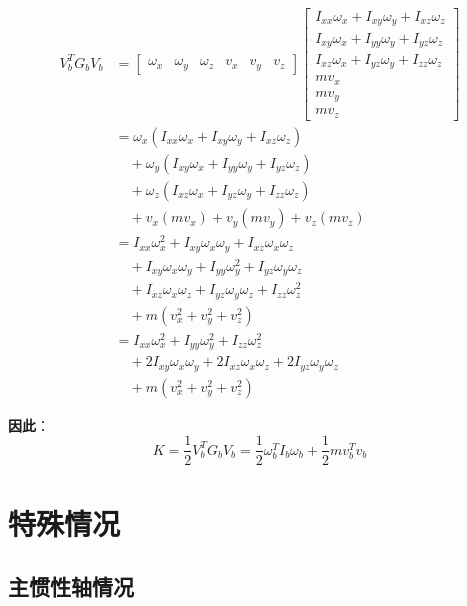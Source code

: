\documentclass[12pt,a4paper]{article}
\begin{document}
\begin{align}
V_b^T G_b V_b &= \begin{bmatrix} \omega_x & \omega_y & \omega_z & v_x & v_y & v_z \end{bmatrix} \begin{bmatrix}
I_{xx}\omega_x + I_{xy}\omega_y + I_{xz}\omega_z \\
I_{xy}\omega_x + I_{yy}\omega_y + I_{yz}\omega_z \\
I_{xz}\omega_x + I_{yz}\omega_y + I_{zz}\omega_z \\
mv_x \\
mv_y \\
mv_z
\end{bmatrix} \\
&= \omega_x(I_{xx}\omega_x + I_{xy}\omega_y + I_{xz}\omega_z) \\
&\quad + \omega_y(I_{xy}\omega_x + I_{yy}\omega_y + I_{yz}\omega_z) \\
&\quad + \omega_z(I_{xz}\omega_x + I_{yz}\omega_y + I_{zz}\omega_z) \\
&\quad + v_x(mv_x) + v_y(mv_y) + v_z(mv_z) \\
&= I_{xx}\omega_x^2 + I_{xy}\omega_x\omega_y + I_{xz}\omega_x\omega_z \\
&\quad + I_{xy}\omega_x\omega_y + I_{yy}\omega_y^2 + I_{yz}\omega_y\omega_z \\
&\quad + I_{xz}\omega_x\omega_z + I_{yz}\omega_y\omega_z + I_{zz}\omega_z^2 \\
&\quad + m(v_x^2 + v_y^2 + v_z^2) \\
&= I_{xx}\omega_x^2 + I_{yy}\omega_y^2 + I_{zz}\omega_z^2 \\
&\quad + 2I_{xy}\omega_x\omega_y + 2I_{xz}\omega_x\omega_z + 2I_{yz}\omega_y\omega_z \\
&\quad + m(v_x^2 + v_y^2 + v_z^2)
\end{align}

\textbf{因此}：
\begin{equation}
K = \frac{1}{2}V_b^T G_b V_b = \frac{1}{2}\omega_b^T I_b \omega_b + \frac{1}{2}mv_b^T v_b
\end{equation}

\section{特殊情况}

\subsection{主惯性轴情况}
\end{document}
